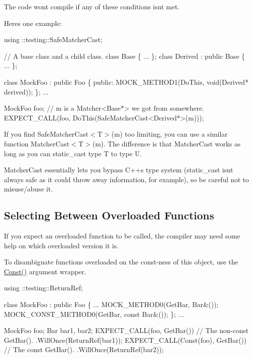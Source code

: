 The code won\textquotesingle{}t compile if any of these conditions isn\textquotesingle{}t met.

Here\textquotesingle{}s one example\+:


\begin{DoxyCode}
using ::testing::SafeMatcherCast;

// A base class and a child class.
class Base \{ ... \};
class Derived : public Base \{ ... \};

class MockFoo : public Foo \{
 public:
  MOCK\_METHOD1(DoThis, void(Derived* derived));
\};
...

  MockFoo foo;
  // m is a Matcher<Base*> we got from somewhere.
  EXPECT\_CALL(foo, DoThis(SafeMatcherCast<Derived*>(m)));
\end{DoxyCode}


If you find {\ttfamily Safe\+Matcher\+Cast$<$T$>$(m)} too limiting, you can use a similar function {\ttfamily Matcher\+Cast$<$T$>$(m)}. The difference is that {\ttfamily Matcher\+Cast} works as long as you can {\ttfamily static\+\_\+cast} type {\ttfamily T} to type {\ttfamily U}.

{\ttfamily Matcher\+Cast} essentially lets you bypass C++\textquotesingle{}s type system ({\ttfamily static\+\_\+cast} isn\textquotesingle{}t always safe as it could throw away information, for example), so be careful not to misuse/abuse it.

\subsection*{Selecting Between Overloaded Functions}

If you expect an overloaded function to be called, the compiler may need some help on which overloaded version it is.

To disambiguate functions overloaded on the const-\/ness of this object, use the {\ttfamily \hyperlink{namespacetesting_a945ac56c5508a3c9c032bbe8aae8dcfa}{Const()}} argument wrapper.


\begin{DoxyCode}
using ::testing::ReturnRef;

class MockFoo : public Foo \{
  ...
  MOCK\_METHOD0(GetBar, Bar&());
  MOCK\_CONST\_METHOD0(GetBar, const Bar&());
\};
...

  MockFoo foo;
  Bar bar1, bar2;
  EXPECT\_CALL(foo, GetBar())         // The non-const GetBar().
      .WillOnce(ReturnRef(bar1));
  EXPECT\_CALL(Const(foo), GetBar())  // The const GetBar().
      .WillOnce(ReturnRef(bar2));
\end{DoxyCode}


